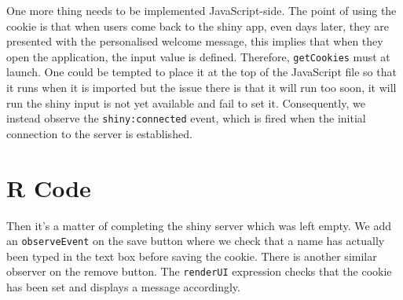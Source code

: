 \documentclass[
  10pt,
]{krantz}
\makeatletter
\newenvironment{Shaded}{\begin{snugshade}}{\end{snugshade}}
\newcommand{\AttributeTok}[1]{\textcolor[rgb]{0.61,0.61,0.61}{#1}}
\newcommand{\CommentTok}[1]{\textcolor[rgb]{0.37,0.37,0.37}{\textit{#1}}}
\newcommand{\KeywordTok}[1]{\textcolor[rgb]{0.27,0.27,0.27}{\textbf{#1}}}
\newcommand{\NormalTok}[1]{#1}
\newcommand{\OperatorTok}[1]{\textcolor[rgb]{0.43,0.43,0.43}{\textbf{#1}}}
\newcommand{\StringTok}[1]{\textcolor[rgb]{0.5,0.5,0.5}{#1}}
\newenvironment{kframe}{%
\medskip{}
\setlength{\fboxsep}{.8em}
 \def\at@end@of@kframe{}%
 \ifinner\ifhmode%
  \def\at@end@of@kframe{\end{minipage}}%
  \begin{minipage}{\columnwidth}%
 \fi\fi%
 \def\FrameCommand##1{\hskip\@totalleftmargin \hskip-\fboxsep
 \colorbox{shadecolor}{##1}\hskip-\fboxsep
     \hskip-\linewidth \hskip-\@totalleftmargin \hskip\columnwidth}%
 \MakeFramed {\advance\hsize-\width
   \@totalleftmargin\z@ \linewidth\hsize
   \@setminipage}}%
 {\par\unskip\endMakeFramed%
 \at@end@of@kframe}
\renewenvironment{Shaded}{\begin{kframe}}{\end{kframe}}
\makeatother
\begin{document}
One more thing needs to be implemented JavaScript-side. The point of using the cookie is that when users come back to the shiny app, even days later, they are presented with the personalised welcome message, this implies that when they open the application, the input value is defined. Therefore, \texttt{getCookies} must at launch. One could be tempted to place it at the top of the JavaScript file so that it runs when it is imported but the issue there is that it will run too soon, it will run the shiny input is not yet available and fail to set it. Consequently, we instead observe the \texttt{shiny:connected} event, which is fired when the initial connection to the server is established.

\begin{Shaded}
\end{Shaded}

\hypertarget{shiny-cookies-r-code}{%
\section{R Code}\label{shiny-cookies-r-code}}

Then it's a matter of completing the shiny server which was left empty. We add an \texttt{observeEvent} on the save button where we check that a name has actually been typed in the text box before saving the cookie. There is another similar observer on the remove button. The \texttt{renderUI} expression checks that the cookie has been set and displays a message accordingly.
\end{document}
